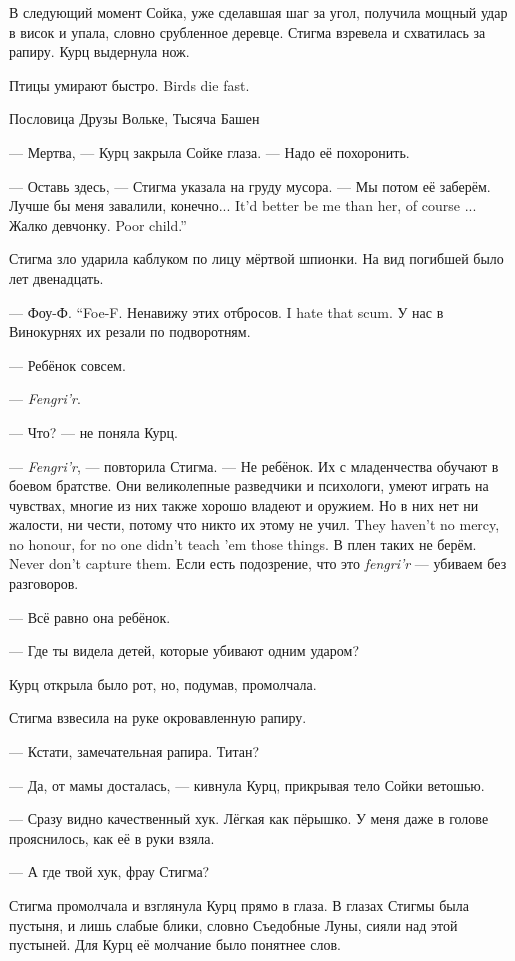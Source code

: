 В следующий момент Сойка, уже сделавшая шаг за угол, получила мощный удар в висок и упала, словно срубленное деревце.
Стигма взревела и схватилась за рапиру.
Курц выдернула нож.

\textspace

\epigraph
{
{Птицы умирают быстро.}
{Birds die fast.}}
{Пословица Друзы Вольке, Тысяча Башен}

--- Мертва, --- Курц закрыла Сойке глаза.
--- Надо её похоронить.

--- Оставь здесь, --- Стигма указала на груду мусора.
--- Мы потом её заберём.
{Лучше бы меня завалили, конечно...}
{It'd better be me than her, of course ...}
{Жалко девчонку.}
{Poor child.''}

Стигма зло ударила каблуком по лицу мёртвой шпионки.
На вид погибшей было лет двенадцать.

{--- Фоу-Ф.}
{``Foe-F.}
{Ненавижу этих отбросов.}
{I hate that scum.}
У нас в Винокурнях их резали по подворотням.

--- Ребёнок совсем.

--- \textit{Fengri'r}.

--- Что? --- не поняла Курц.

--- \textit{Fengri'r}, --- повторила Стигма.
--- Не ребёнок.
Их с младенчества обучают в боевом братстве.
Они великолепные разведчики и психологи, умеют играть на чувствах, многие из них также хорошо владеют и оружием.
{Но в них нет ни жалости, ни чести, потому что никто их этому не учил.}
{They haven't no mercy, no honour, for no one didn't teach 'em those things.}
{В плен таких не берём.}
{Never don't capture them.}
Если есть подозрение, что это \textit{fengri'r} --- убиваем без разговоров.

--- Всё равно она ребёнок.

--- Где ты видела детей, которые убивают одним ударом?

Курц открыла было рот, но, подумав, промолчала.

Стигма взвесила на руке окровавленную рапиру.

--- Кстати, замечательная рапира.
Титан?

--- Да, от мамы досталась, --- кивнула Курц, прикрывая тело Сойки ветошью.

--- Сразу видно качественный хук.
Лёгкая как пёрышко.
У меня даже в голове прояснилось, как её в руки взяла.

--- А где твой хук, фрау Стигма?

Стигма промолчала и взглянула Курц прямо в глаза.
В глазах Стигмы была пустыня, и лишь слабые блики, словно Съедобные Луны, сияли над этой пустыней.
Для Курц её молчание было понятнее слов.

